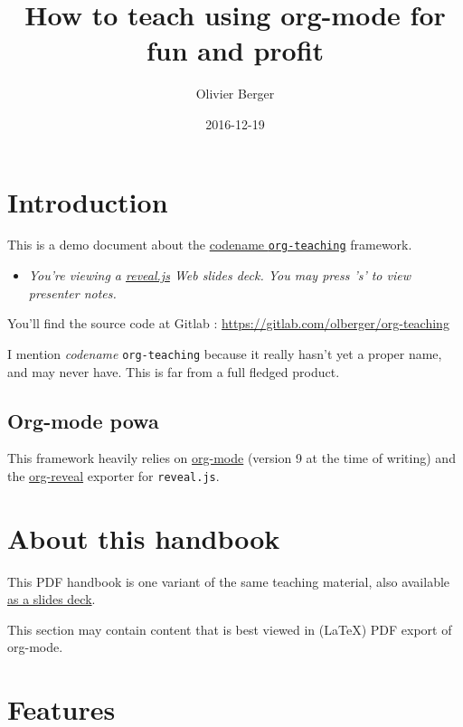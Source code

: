 \documentclass[a4paper]{article}
\author{Olivier Berger}
\date{2016-12-19}
\title{How to teach using org-mode for fun and profit}
\begin{document}
\setcounter{tocdepth}{1}
\tableofcontents




\section{Introduction}
\label{sec:org18555cc}

This is a demo document about the
\href{http://www-public.tem-tsp.eu/~berger_o/org-teaching/}{codename \texttt{org-teaching}} framework.

\begin{itemize}
\item \emph{You're viewing a \href{http://lab.hakim.se/reveal-js/}{reveal.js} Web slides deck. You may press 's' to view presenter notes.}
\end{itemize}

\begin{NOTES}
You'll find the source code at Gitlab : \url{https://gitlab.com/olberger/org-teaching}

I mention \emph{codename} \texttt{org-teaching} because it really hasn't yet a proper name, and may never have. This is far from a full fledged product.
\end{NOTES}

\subsection{Org-mode powa}
\label{sec:org0962657}

This framework heavily relies on \href{http://orgmode.org/}{org-mode} (version 9 at the time of writing) and the \href{https://github.com/yjwen/org-reveal/}{org-reveal} exporter for \texttt{reveal.js}.

\section{About this handbook}
\label{sec:org145e73a}

This PDF handbook is one variant of the same teaching material, also available \href{./slides.html}{as a slides deck}.

This section may contain content that is best viewed in (\LaTeX{}) PDF export of org-mode.

\section{Features}
\label{sec:org2d01d1d}
\end{document}
